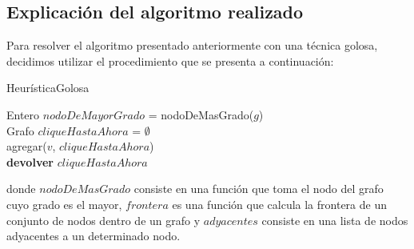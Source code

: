 \subsection{Explicación del algoritmo realizado}
Para resolver el algoritmo presentado anteriormente con una técnica golosa, decidimos utilizar el procedimiento que se presenta a continuación:\newline
\newline
\begin{algorithm}[H]
    \SetAlgoLined
    \caption{HeurísticaGolosa}
	Entero $nodoDeMayorGrado$ = nodoDeMasGrado($g$)\\
	Grafo $cliqueHastaAhora$ = $\emptyset$\\
	agregar($v$, $cliqueHastaAhora$)\\
\textbf{devolver} $cliqueHastaAhora$
\end{algorithm}

donde $nodoDeMasGrado$ consiste en una función que toma el nodo del grafo cuyo grado es el mayor, $frontera$ es una función que calcula la frontera de un conjunto de nodos dentro de un grafo y $adyacentes$ consiste en una lista de nodos adyacentes a un determinado nodo.\newline


